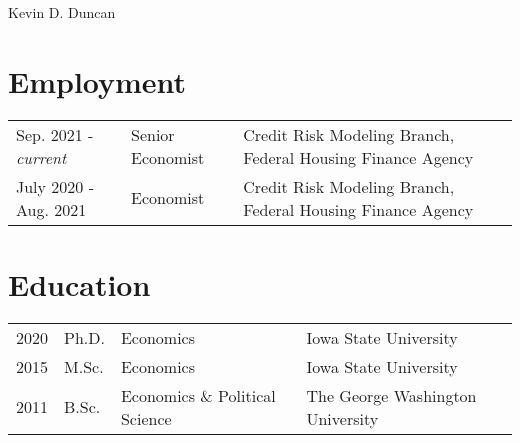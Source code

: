 \documentclass[letterpaper]{article}
\def\name{Kevin D. Duncan}
\begin{document}
{\huge \name} 


\vspace{0.0in}




\section*{Employment}

\begin{tabular}{@{}llll}
  Sep. 2021 - \textit{current}  & Senior Economist & Credit Risk Modeling Branch, Federal Housing Finance Agency \\
  July 2020 - Aug. 2021  & Economist & Credit Risk Modeling Branch, Federal Housing Finance Agency \\
 
\end{tabular}

\section*{Education}

\begin{tabular}{@{}llll}
  2020  & Ph.D. & Economics &Iowa State University \\
    2015 &M.Sc. & Economics &Iowa State University \\
  2011 & B.Sc. & Economics \& Political Science & The George Washington University
\end{tabular}
\end{document}
